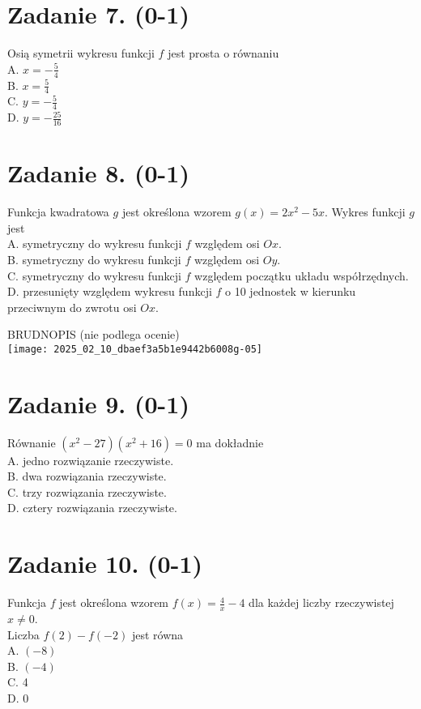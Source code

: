 \documentclass[10pt]{article}
\begin{document}
\section*{Zadanie 7. (0-1)}
Osią symetrii wykresu funkcji \(f\) jest prosta o równaniu\\
A. \(x=-\frac{5}{4}\)\\
B. \(x=\frac{5}{4}\)\\
C. \(y=-\frac{5}{4}\)\\
D. \(y=-\frac{25}{16}\)

\section*{Zadanie 8. (0-1)}
Funkcja kwadratowa \(g\) jest określona wzorem \(g(x)=2 x^{2}-5 x\). Wykres funkcji \(g\) jest\\
A. symetryczny do wykresu funkcji \(f\) względem osi \(O x\).\\
B. symetryczny do wykresu funkcji \(f\) względem osi \(O y\).\\
C. symetryczny do wykresu funkcji \(f\) względem początku układu współrzędnych.\\
D. przesunięty względem wykresu funkcji \(f\) o 10 jednostek w kierunku przeciwnym do zwrotu osi \(O x\).

BRUDNOPIS (nie podlega ocenie)\\
\texttt{[image: 2025\_02\_10\_dbaef3a5b1e9442b6008g-05]}

\section*{Zadanie 9. (0-1)}
Równanie \(\left(x^{2}-27\right)\left(x^{2}+16\right)=0\) ma dokładnie\\
A. jedno rozwiązanie rzeczywiste.\\
B. dwa rozwiązania rzeczywiste.\\
C. trzy rozwiązania rzeczywiste.\\
D. cztery rozwiązania rzeczywiste.

\section*{Zadanie 10. (0-1)}
Funkcja \(f\) jest określona wzorem \(f(x)=\frac{4}{x}-4\) dla każdej liczby rzeczywistej \(x \neq 0\).\\
Liczba \(f(2)-f(-2)\) jest równa\\
A. \((-8)\)\\
B. \((-4)\)\\
C. 4\\
D. 0
\end{document}
